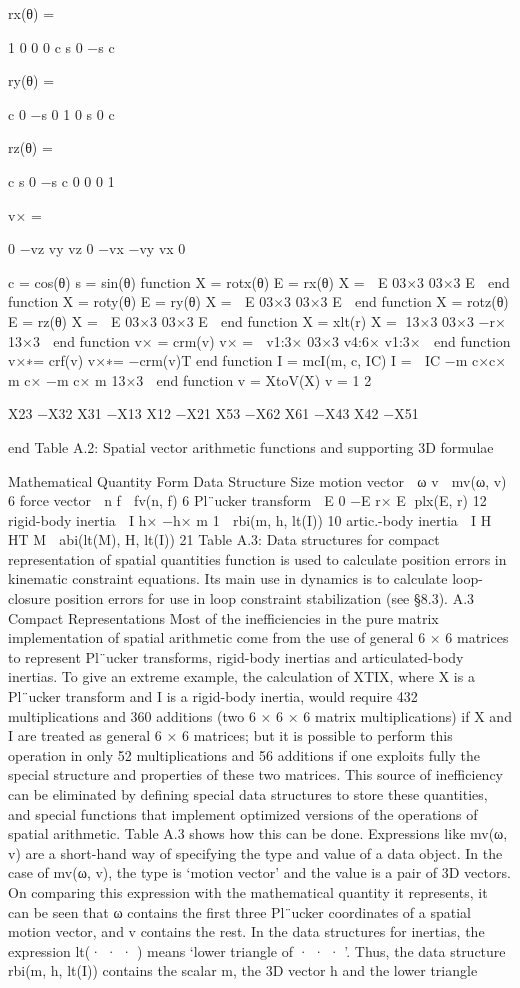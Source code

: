 rx(θ) =

1 0 0 0 c s 0 −s c

ry(θ) =

c 0 −s 0 1 0 s 0 c

rz(θ) =

c s 0 −s c 0 0 0 1

v× =

0 −vz vy vz 0 −vx −vy vx 0

c = cos(θ) s = sin(θ) function X = rotx(θ) E = rx(θ) X =  E 03×3 03×3 E  end function X = roty(θ) E = ry(θ) X =  E 03×3 03×3 E  end function X = rotz(θ) E = rz(θ) X =  E 03×3 03×3 E  end function X = xlt(r) X = 13×3 03×3 −r× 13×3  end function v× = crm(v) v× =  v1:3× 03×3 v4:6× v1:3×  end function v×∗= crf(v) v×∗= −crm(v)T end function I = mcI(m, c, IC) I =  IC −m c×c× m c× −m c× m 13×3  end function v = XtoV(X) v = 1 2

X23 −X32 X31 −X13 X12 −X21 X53 −X62 X61 −X43 X42 −X51

end Table A.2: Spatial vector arithmetic functions and supporting 3D formulae

Mathematical Quantity Form Data Structure Size motion vector  ω v  mv(ω, v) 6 force vector  n f  fv(n, f) 6 Pl¨ucker transform  E 0 −E r× E  plx(E, r) 12 rigid-body inertia  I h× −h× m 1  rbi(m, h, lt(I)) 10 artic.-body inertia  I H HT M  abi(lt(M), H, lt(I)) 21 Table A.3: Data structures for compact representation of spatial quantities function is used to calculate position errors in kinematic constraint equations. Its main use in dynamics is to calculate loop-closure position errors for use in loop constraint stabilization (see §8.3). A.3 Compact Representations Most of the inefficiencies in the pure matrix implementation of spatial arithmetic come from the use of general 6 × 6 matrices to represent Pl¨ucker transforms, rigid-body inertias and articulated-body inertias. To give an extreme example, the calculation of XTIX, where X is a Pl¨ucker transform and I is a rigid-body inertia, would require 432 multiplications and 360 additions (two 6 × 6 × 6 matrix multiplications) if X and I are treated as general 6 × 6 matrices; but it is possible to perform this operation in only 52 multiplications and 56 additions if one exploits fully the special structure and properties of these two matrices. This source of inefficiency can be eliminated by defining special data structures to store these quantities, and special functions that implement optimized versions of the operations of spatial arithmetic. Table A.3 shows how this can be done. Expressions like mv(ω, v) are a short-hand way of specifying the type and value of a data object. In the case of mv(ω, v), the type is ‘motion vector’ and the value is a pair of 3D vectors. On comparing this expression with the mathematical quantity it represents, it can be seen that ω contains the first three Pl¨ucker coordinates of a spatial motion vector, and v contains the rest. In the data structures for inertias, the expression lt(· · · ) means ‘lower triangle of · · · ’. Thus, the data structure rbi(m, h, lt(I)) contains the scalar m, the 3D vector h and the lower triangle

